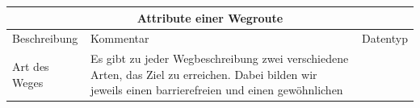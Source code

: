 \begin{tabular}{| l | p{9.45cm} | c| } \hline
    \multicolumn{3}{|c|}{\textbf{Attribute einer Wegroute}}                                                                                                                                                                                                                                                                                                                                                                                                                                                                                                                                                                                                                                                                                                                                                                                                                         \\ \hline\hline
    Beschreibung                                                                                                                                                                                                                                                                                                                                                                                                                                                                                                                                                    & Kommentar                                                                                                                                                                                                                                                                                          & Datentyp \\
    \hline
    Art des Weges                                                                                                                                                                                                                                                                                                                                                                                                                                                                                                                                                   & \small Es gibt zu jeder Wegbeschreibung zwei verschiedene Arten, das Ziel
    zu erreichen. Dabei bilden wir jeweils einen barrierefreien und einen gewöhnlichen

\end{tabular}
